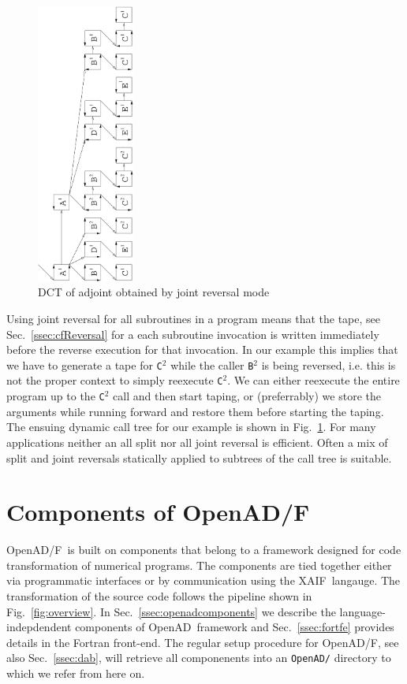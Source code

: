 \documentclass[11pt]{article}
\newcommand{\OpenADF}{OpenAD/F}
\newcommand{\OpenAD}{OpenAD}
\newcommand{\xaif}{XAIF}
\newcommand{\refsec}[1]{{Sec.~\ref{#1}}}
\newcommand{\reffig}[1]{{Fig.~\ref{#1}}}
\begin{document}
\begin{figure}[t]
\centerline{\includegraphics[width=3.2cm,origin=c,angle=-90]{edct_joint_ns}}
\vspace*{-3cm}
\caption{DCT of adjoint obtained by joint reversal mode}
\label{fig:joint}
\end{figure}

Using joint reversal for all subroutines in a program 
means that the tape, see \refsec{ssec:cfReversal} for a each 
subroutine invocation is written immediately before the reverse execution for 
that invocation. In our example this implies that we have to generate 
a tape for {\tt C}$^2$ while the caller {\tt B}$^2$ is being reversed, 
i.e. this is not the proper context to simply reexecute {\tt C}$^2$. 
We can either reexecute the entire program up to the  {\tt C}$^2$
call and then start taping, or (preferrably) we store the arguments while 
running forward and restore them before starting the taping. 
The ensuing dynamic call tree for our example is 
shown in \reffig{fig:joint}. 
For many applications neither an all split nor all joint reversal
is efficient. Often a mix of split and joint reversals statically  
applied to subtrees of the call tree is suitable.  

\section{Components of \OpenADF}\label{sec:openadfcomponents}

\OpenADF\ is built on components that belong to a framework designed
for code transformation of numerical programs.  The components are
tied together either via programmatic interfaces or by communication
using the \xaif\ langauge. The transformation of the source code follows the
pipeline shown in \reffig{fig:overview}.  
In \refsec{ssec:openadcomponents} we describe the language-indepdendent 
components of \OpenAD\ framework and \refsec{ssec:fortfe} provides details 
in the Fortran front-end.
The regular setup procedure for \OpenADF, see also \refsec{ssec:dab}, 
will retrieve all componenents into an {\tt OpenAD/} directory to which 
we refer from here on.  
\end{document}
